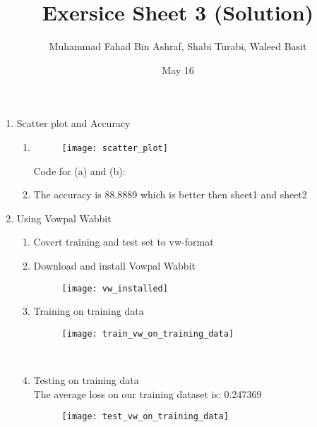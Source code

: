 \documentclass[12pt, a4paper]{article}
\title{Exersice Sheet 3 (Solution)}
\author{Muhammad Fahad Bin Ashraf, Shabi Turabi, Waleed Basit}
\date{May 16}
\begin{document}
 
\begin{titlepage}
\maketitle
\end{titlepage}

\begin{enumerate}
    \item Scatter plot and Accuracy
    \begin{enumerate}
        \item
        \begin{figure}[h]
            \centering
            \texttt{[image: scatter\_plot]}
        \end{figure}
        Code for (a) and (b):\\
        
        \item The accuracy is 88.8889 which is better then sheet1 and sheet2
    \end{enumerate}
    \item Using Vowpal Wabbit
    \begin{enumerate}
        \item Covert training and test set to vw-format
        
        \pagebreak
        \item Download and install Vowpal Wabbit
        \begin{figure}[h]
            \centering
            \texttt{[image: vw\_installed]}
        \end{figure}
        \item Training on training data
        \begin{figure}[h]
            \centering
            \texttt{[image: train\_vw\_on\_training\_data]}
        \end{figure} \\
        \item Testing on training data \\
        The average loss on our training dataset is: 0.247369
        \begin{figure}[h]
            \centering
            \texttt{[image: test\_vw\_on\_training\_data]}
        \end{figure}
    \end{enumerate}
\end{enumerate}
\end{document}

